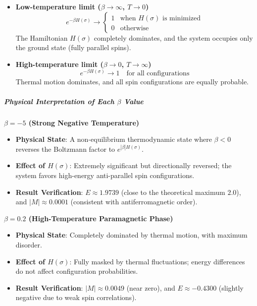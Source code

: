 \documentclass[11pt]{article}
\providecommand{\tightlist}{%
      \setlength{\itemsep}{0pt}\setlength{\parskip}{0pt}}
\begin{document}
\begin{itemize}
\item
  \textbf{Low-temperature limit (\(\beta \to \infty\), \(T \to 0\))} \[
  e^{-\beta H(\sigma)} \to \begin{cases}
  1 & \text{when } H(\sigma) \text{ is minimized} \\
  0 & \text{otherwise}
  \end{cases}
  \] The Hamiltonian \(H(\sigma)\) completely dominates, and the system
  occupies only the ground state (fully parallel spins).
\item
  \textbf{High-temperature limit (\(\beta \to 0\), \(T \to \infty\))} \[
  e^{-\beta H(\sigma)} \to 1 \quad \text{for all configurations}
  \] Thermal motion dominates, and all spin configurations are equally
  probable.
\end{itemize}

\subparagraph{\texorpdfstring{Physical Interpretation of Each \(\beta\)
Value}{Physical Interpretation of Each \textbackslash beta Value}}\label{physical-interpretation-of-each-beta-value}

\textbf{\(\beta = -5\) (Strong Negative Temperature)}

\begin{itemize}
\tightlist
\item
  \textbf{Physical State}: A non-equilibrium thermodynamic state where
  \(\beta < 0\) reverses the Boltzmann factor to
  \(e^{|\beta| H(\sigma)}\).
\item
  \textbf{Effect of \(H(\sigma)\)}: Extremely significant but
  directionally reversed; the system favors high-energy anti-parallel
  spin configurations.
\item
  \textbf{Result Verification}: \(E \approx 1.9739\) (close to the
  theoretical maximum \(2.0\)), and \(|M| \approx 0.0001\) (consistent
  with antiferromagnetic order).
\end{itemize}

\textbf{\(\beta = 0.2\) (High-Temperature Paramagnetic Phase)}

\begin{itemize}
\tightlist
\item
  \textbf{Physical State}: Completely dominated by thermal motion, with
  maximum disorder.
\item
  \textbf{Effect of \(H(\sigma)\)}: Fully masked by thermal
  fluctuations; energy differences do not affect configuration
  probabilities.
\item
  \textbf{Result Verification}: \(|M| \approx 0.0049\) (near zero), and
  \(E \approx -0.4300\) (slightly negative due to weak spin
  correlations).
\end{itemize}
\end{document}
